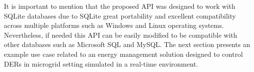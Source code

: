 It is important to mention that the proposed API was designed to work with SQLite databases due to SQLite great portability and excellent compatibility across multiple platforms such as Windows and Linux operating systems. Nevertheless, if needed this API can be easily modified to be compatible with other databases such as Microsoft SQL and MySQL. The next section presents an example use case related to an energy management solution designed to control DERs in microgrid setting simulated in a real-time environment.



 